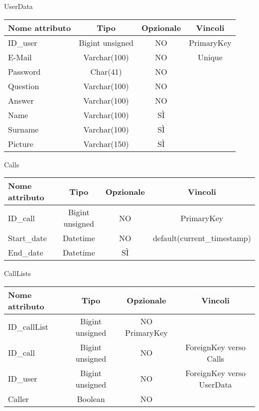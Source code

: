\begin{center}

UserData

\begin{center}
\begin{tabular}{lccc}
\toprule
Nome attributo & Tipo & Opzionale & Vincoli\\
\midrule
ID\_user & Bigint unsigned & NO & PrimaryKey\\
E-Mail & Varchar(100) & NO & Unique\\
Password & Char(41) & NO &\\
Question & Varchar(100) & NO &\\
Answer & Varchar(100) & NO &\\
Name & Varchar(100) & SÌ &\\
Surname & Varchar(100) & SÌ &\\
Picture & Varchar(150) & SÌ &\\
\bottomrule
\end{tabular}
\end{center}

Calls

\begin{center}
\begin{tabular}{lccc}
\toprule
Nome attributo & Tipo & Opzionale & Vincoli\\
\midrule
ID\_call & Bigint unsigned & NO & PrimaryKey\\
Start\_date & Datetime & NO & default(current\_timestamp)\\
End\_date & Datetime & SÌ &\\
\bottomrule
\end{tabular}
\end{center}

CallLists

\begin{center}
\begin{tabular}{lccc}
\toprule
Nome attributo & Tipo & Opzionale & Vincoli\\
\midrule
ID\_callList & Bigint unsigned & NO PrimaryKey\\
ID\_call & Bigint unsigned & NO & ForeignKey verso Calls\\
ID\_user & Bigint unsigned & NO & ForeignKey verso UserData \\
Caller & Boolean & NO &\\
\bottomrule
\end{tabular}
\end{center}


\end{center}
